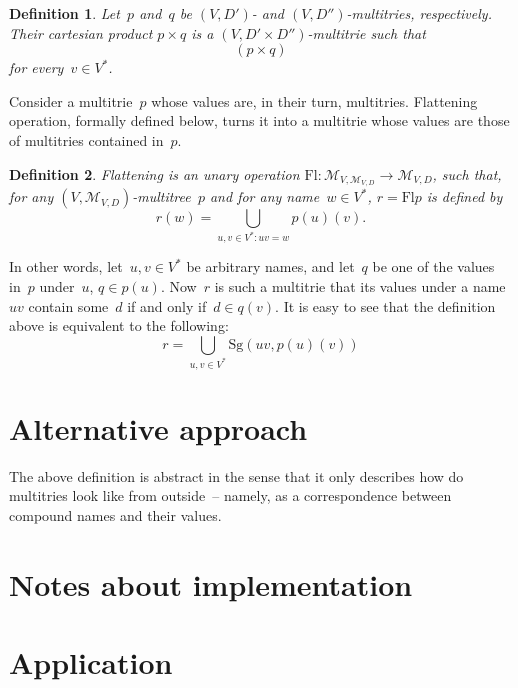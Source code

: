 \documentclass{article}
\newtheorem{Df}{Definition}
\newcommand{\set}[1]{\mathcal{#1}}
\newcommand{\setmt}[2]{\set{M}_{#1,#2}}
\newcommand{\flatten}{\mathrm{Fl}}
\newcommand{\singleleaf}{\mathrm{Sg}}
\begin{document}
\begin{Df}
Let~$p$ and~$q$ be $(V,D')$- and $(V,D'')$-multitries, respectively. Their
\emph{cartesian product} $p\times q$ is a $(V,D'\times D'')$-multitrie such that
\[
  (p\times q) %
\]
for every~$v\in V^\ast$.
\end{Df}

Consider a multitrie~$p$ whose values are, in their turn, multitries.
Flattening operation, formally defined below, turns it into a multitrie whose
values are those of multitries contained in~$p$.
\begin{Df}
\emph{Flattening} is an unary operation $\flatten : \setmt{V}{\setmt{V}{D}}
\to\setmt{V}{D}$, such that, for any $(V,\setmt{V}{D})$-multitree~$p$ and for any
name~$w\in V^\ast$, $r=\flatten p$ is defined by
\[
  r(w) = \bigcup_{u,v\in V^\ast: uv = w} p(u)(v) .
\]
\end{Df}

In other words, let~$u, v\in V^\ast$ be arbitrary names, and let~$q$ be one of
the values in~$p$ under~$u$, $q \in p(u)$. Now~$r$ is such a multitrie that its
values under a name~$uv$ contain some~$d$ if and only if~$d\in q(v)$. It is
easy to see that the definition above is equivalent to the following:
\[
  r = \bigcup_{u,v\in V^\ast} \singleleaf(uv, p(u)(v))
\]

\section{Alternative approach}

The above definition is abstract in the sense that it only describes how do
multitries look like from outside~-- namely, as a correspondence between
compound names and their values.

\section{Notes about implementation}

\section{Application}
\end{document}
